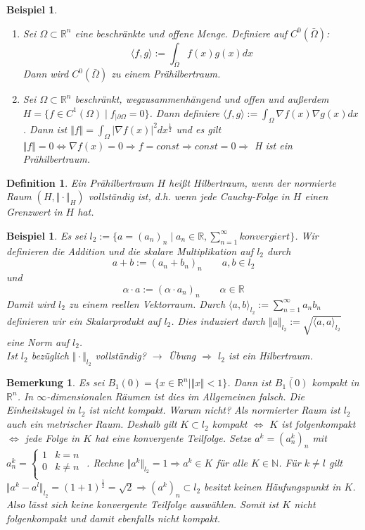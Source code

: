 \documentclass[12pt,titlepage]{article}
\newtheorem{definition}[zahl]{Definition}
\newtheorem{bsp}[zahl]{Beispiel}
\newtheorem{bemerkung}[zahl]{Bemerkung}
\numberwithin{equation}{section}
\begin{document}
\begin{bsp}
\begin{enumerate}
\item Sei $\Omega\subset \mathbb{R}^n$ eine beschränkte und offene Menge. Definiere auf $C^0(\bar{\Omega})$:
\[
\langle f,g \rangle := \int_{\bar{\Omega}} f(x)g(x)dx
\]
Dann wird $C^0(\bar{\Omega})$ zu einem Prähilbertraum.
\item Sei $\Omega \subset \mathbb{R}^n$ beschränkt, wegzusammenhängend und offen und außerdem $H=\{f \in C^1(\Omega)\mid f_{|\partial \Omega}=0\}$. Dann definiere $\langle f,g \rangle:=\int_\Omega \nabla f(x) \nabla g(x)dx$. Dann ist $\Vert f\Vert =\int_\Omega \vert \nabla f(x)\vert^2dx^{\frac{1}{2}}$ und es gilt $\Vert f \Vert =0 \Leftrightarrow \nabla f(x)=0 \Rightarrow f=const \Rightarrow const =0\Rightarrow$ H ist ein Prähilbertraum.
\end{enumerate}
\end{bsp}
\begin{definition}
Ein Prähilbertraum $H$ heißt Hilbertraum, wenn der normierte Raum $(H,\Vert \cdot \Vert_H)$ vollständig ist, d.h. wenn jede Cauchy-Folge in $H$  einen Grenzwert in $H$ hat.
\end{definition}
\begin{bsp}
Es sei $l_2:=\{a=(a_n)_n \mid a_n \in \mathbb{R}, \sum_{n=1}^{\infty} konvergiert \}$. Wir definieren die Addition und die skalare Multiplikation auf $l_2$ durch 
\[
a+b:=(a_n+b_n)_n \qquad a,b \in l_2
\]
und 
\[
\alpha \cdot a:= (\alpha\cdot a_n)_n \qquad \alpha \in \mathbb{R}
\]
Damit wird $l_2$ zu einem reellen Vektorraum. Durch $\langle  a,b\rangle_{l_2}:= \sum_{n=1}^{\infty}a_nb_n$ definieren wir ein Skalarprodukt auf $l_2$. Dies induziert durch $\Vert a \Vert_{l_2}:=\sqrt{\langle  a,a\rangle_{l_2}}$ eine Norm auf $l_2$.\\
Ist $l_2$ bezüglich $\Vert \cdot \Vert_{l_2}$ vollständig? $\rightarrow$ Übung $\Rightarrow$ $l_2$ ist ein Hilbertraum.
\end{bsp}
\begin{bemerkung}
Es sei $B_1(0)=\{x\in \mathbb{R}^n\mid \Vert x \Vert < 1\}$. Dann ist $\overline{B_1(0)}$ kompakt in $\mathbb{R}^n$. In $\infty$-dimensionalen Räumen ist dies im Allgemeinen falsch. Die Einheitskugel in $l_2$ ist nicht kompakt. Warum nicht? Als normierter Raum ist $l_2$ auch ein metrischer Raum. Deshalb gilt $K \subset l_2$ kompakt $\Leftrightarrow$ $K$ ist folgenkompakt $\Leftrightarrow $ jede Folge in $K$ hat eine konvergente Teilfolge.
Setze $a^k=(a^k_n)_n$ mit $a^k_n=
 \left\{
\begin{array}{ll}
1 & k =n \\
0 & k \neq n \\
\end{array}
\right.$ . Rechne $\Vert a^k \Vert_{l_2} =1 \Rightarrow a^k \in K$ für alle $K\in \mathbb{N}$. Für $k\neq l$ gilt $\Vert a^k-a^l \Vert_{l_2}=(1+1)^{\frac{1}{2}}=\sqrt{2} \Rightarrow (a^k)_n \subset l_2$ besitzt keinen Häufungspunkt in $K$. Also lässt sich keine konvergente Teilfolge auswählen. Somit ist $K$ nicht folgenkompakt und damit ebenfalls nicht kompakt.
\end{bemerkung}
\end{document}
